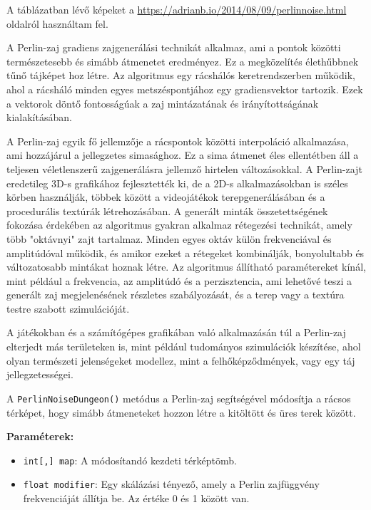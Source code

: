 \newpage
A táblázatban lévő képeket a \url{https://adrianb.io/2014/08/09/perlinnoise.html} oldalról használtam fel.

A Perlin-zaj gradiens zajgenerálási technikát alkalmaz, ami a pontok közötti természetesebb és simább átmenetet eredményez. Ez a megközelítés élethűbbnek tűnő tájképet hoz létre. Az algoritmus egy rácshálós keretrendszerben működik, ahol a rácsháló minden egyes metszéspontjához egy gradiensvektor tartozik. Ezek a vektorok döntő fontosságúak a zaj mintázatának és irányítottságának kialakításában.

A Perlin-zaj egyik fő jellemzője a rácspontok közötti interpoláció alkalmazása, ami hozzájárul a jellegzetes simasághoz. Ez a sima átmenet éles ellentétben áll a teljesen véletlenszerű zajgenerálásra jellemző hirtelen változásokkal. A Perlin-zajt eredetileg 3D-s grafikához fejlesztették ki, de a 2D-s alkalmazásokban is széles körben használják, többek között a videojátékok terepgenerálásában és a procedurális textúrák létrehozásában.
A generált minták összetettségének fokozása érdekében az algoritmus gyakran alkalmaz rétegezési technikát, amely több "oktávnyi" zajt tartalmaz. Minden egyes oktáv külön frekvenciával és amplitúdóval működik, és amikor ezeket a rétegeket kombinálják, bonyolultabb és változatosabb mintákat hoznak létre. Az algoritmus állítható paramétereket kínál, mint például a frekvencia, az amplitúdó és a perzisztencia, ami lehetővé teszi a generált zaj megjelenésének részletes szabályozását, és a terep vagy a textúra testre szabott szimulációját.

A játékokban és a számítógépes grafikában való alkalmazásán túl a Perlin-zaj elterjedt más területeken is, mint például tudományos szimulációk készítése, ahol olyan természeti jelenségeket modellez, mint a felhőképződmények, vagy egy táj jellegzetességei.


A \texttt{PerlinNoiseDungeon()} metódus a Perlin-zaj segítségével módosítja a rácsos térképet, hogy simább átmeneteket hozzon létre a kitöltött és üres terek között.

\textbf{Paraméterek:}
\begin{itemize}
\item \texttt{int[,] map}: A módosítandó kezdeti térképtömb.
\item \texttt{float modifier}: Egy skálázási tényező, amely a Perlin zajfüggvény frekvenciáját állítja be. Az értéke 0 és 1 között van.
\end{itemize}

